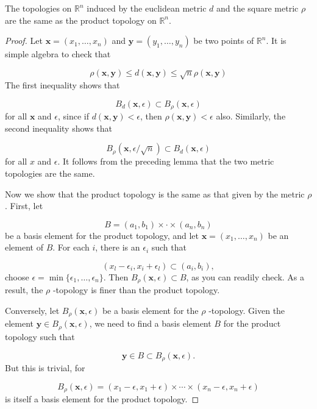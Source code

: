 \begin{theorem}
\label{thm:\thetheorem}
 The topologies on \(\mathbb{R}^{n}\) induced by the euclidean metric \(d\) and the square metric \(\rho\) are the same as the product topology on \(\mathbb{R}^{n}\).
\end{theorem}

\begin{proof}
 Let \(\mathbf{x} = ( {x_{1},\ldots,x_{n}})\) and \(\mathbf{y} = ( {y_{1},\ldots,y_{n}})\) be two points of \(\mathbb{R}^{n}\). It is simple algebra to check that

 \[
 \rho ( {\mathbf{x},\mathbf{y}}) \leq d( {\mathbf{x},\mathbf{y}}) \leq \sqrt{n}\rho ( {\mathbf{x},\mathbf{y}})
 \]
 The first inequality shows that

 \[
 B_{d}( {\mathbf{x},\epsilon }) \subset {B}_{\rho }( {\mathbf{x},\epsilon })
 \]
 for all \(\mathbf{x}\) and \(\epsilon\), since if \(d( {\mathbf{x},\mathbf{y}}) < \epsilon\), then \(\rho ( {\mathbf{x},\mathbf{y}}) < \epsilon\) also. Similarly, the second inequality shows that

 \[
 B_{\rho }( {\mathbf{x},\epsilon /\sqrt{n}}) \subset {B}_{d}( {\mathbf{x},\epsilon })
 \]
 for all \(x\) and \(\epsilon\). It follows from the preceding lemma that the two metric topologies are the same.

 Now we show that the product topology is the same as that given by the metric \(\rho\). First, let

 \[
 B = ( {a_{1},b_{1}}) \times \cdot \times ( {a_{n},b_{n}})
 \]
 be a basis element for the product topology, and let \(\mathbf{x} = ( {x_{1},\ldots,x_{n}})\) be an element of \(B\). For each \(i\), there is an \({\epsilon }_{i}\) such that

 \[
 ( {x_{l} - {\epsilon }_{i},x_{i} + {\epsilon }_{l}}) \subset ( {a_{i},b_{i}}),
 \]
 choose \(\epsilon = \min \{ {{\epsilon }_{1},\ldots,{\epsilon }_{n}}\}\). Then \(B_{\rho }( {\mathbf{x},\epsilon }) \subset B\), as you can readily check. As a result, the \(\rho\) -topology is finer than the product topology.

 Conversely, let \(B_{\rho }( {\mathbf{x},\epsilon })\) be a basis element for the \(\rho\) -topology. Given the element \(\mathbf{y} \in {B}_{\rho }( {\mathbf{x},\epsilon })\), we need to find a basis element \(B\) for the product topology such that

 \[
 \mathbf{y} \in B \subset {B}_{\rho }( {\mathbf{x},\epsilon }) \text{.}
 \]
 But this is trivial, for

 \[
 B_{\rho }( {\mathbf{x},\epsilon }) = ( {x_{1} - \epsilon,x_{1} + \epsilon }) \times \cdots \times ( {x_{n} - \epsilon,x_{n} + \epsilon })
 \]
 is itself a basis element for the product topology.
\end{proof}


